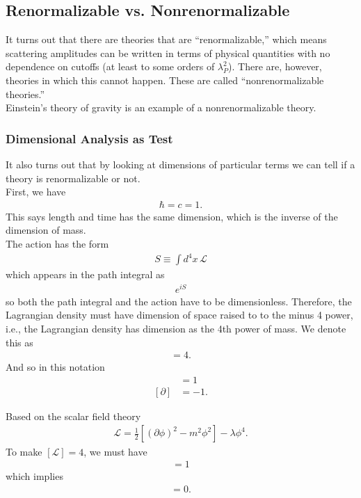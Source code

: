 \documentclass{book}
\theoremstyle{definition}
\newcommand{\p}{\partial}
\newcommand{\lag}{\mathcal{L}}
\newcommand{\f}[2]{\frac{#1}{#2}}
\begin{document}
\newpage

\subsection{Renormalizable vs. Nonrenormalizable}



It turns out that there are theories that are ``renormalizable,'' which means scattering amplitudes can be written in terms of physical quantities with no dependence on cutoffs (at least to some orders of $\lambda_P^2$). There are, however, theories in which this cannot happen. These are called ``nonrenormalizable theories.''\\

Einstein's theory of gravity is an example of a nonrenormalizable theory. 


\subsubsection{Dimensional Analysis as Test}


It also turns out that by looking at dimensions of particular terms we can tell if a theory is renormalizable or not. \\

First, we have 
\begin{align}
\hbar = c = 1.
\end{align}
This says length and time has the same dimension, which is the inverse of the dimension of mass. \\

The action has the form
\begin{align}
S \equiv \int d^4x\,\lag
\end{align}
which appears in the path integral as
\begin{align}
e^{iS}
\end{align}
so both the path integral and the action have to be dimensionless. Therefore, the Lagrangian density must have dimension of space raised to to the minus 4 power, i.e., the Lagrangian density has dimension as the 4th power of mass. We denote this as
\begin{align}
[\lag] = 4.
\end{align}
And so in this notation 
\begin{align}
[x] &= 1 \\ 
[\p] &= -1.
\end{align}

Based on the scalar field theory
\begin{align}
\lag = \f{1}{2}[(\p\phi)^2 - m^2 \phi^2]  - \lambda \phi^4.
\end{align}
To make $[\lag] = 4$, we must have
\begin{align}
[\phi] = 1
\end{align}
which implies
\begin{align}
[\lambda] = 0.
\end{align}
\end{document}
